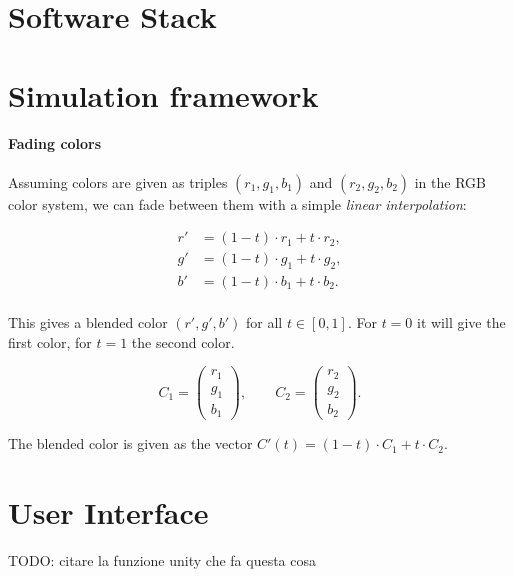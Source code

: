 \section{Software Stack}
\section{Simulation framework}

\paragraph{Fading colors}

Assuming colors are given as triples $(r_1,g_1,b_1)$ and $(r_2,g_2,b_2)$ in the RGB color system, we can fade between them with a simple \textit{linear interpolation}:

\begin{align}
r' &= (1-t)\cdot r_1+t\cdot r_2,\\
g' &= (1-t)\cdot g_1+t\cdot g_2,\\
b' &= (1-t)\cdot b_1+t\cdot b_2.\\
\end{align}

This gives a blended color $(r',g',b')$ for all $t\in[0,1]$. For $t=0$ it will give the first color, for $t=1$ the second color.



$$ C_1=\begin{pmatrix}r_1\\g_1\\b_1\end{pmatrix}, \qquad C_2=\begin{pmatrix}r_2\\g_2\\b_2\end{pmatrix}.$$

The blended color is given as the vector $C'(t)=(1-t)\cdot C_1+t\cdot C_2$.
\section{User Interface}

TODO: citare la funzione unity che fa questa cosa